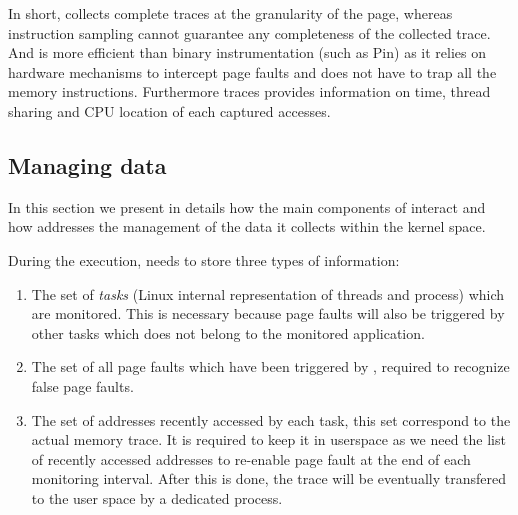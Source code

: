 In short, \Moca collects complete traces at the granularity of the page, whereas instruction
sampling cannot guarantee any completeness of the collected trace. And \Moca is 
more efficient than binary instrumentation (such as Pin) as it relies on hardware mechanisms
to intercept page faults and does not have to trap all the memory instructions.
Furthermore \Moca traces provides information on time, thread sharing and CPU
location of each captured accesses.


\subsection{Managing data}
\label{sec:design-tech}

In this section we present in details how the main components of \Moca
interact and how \Moca addresses the management of the data it collects
within the kernel space.

During the execution, \Moca needs to store three types of information:
\begin{enumerate}
    \item The set of \emph{tasks} (Linux internal representation of threads and process) which are
monitored. This is necessary because page faults will also be triggered by other tasks which does not belong to
the monitored application.
    \item The set of all page faults which have been triggered by \Moca,
        required to recognize false page faults.
    \item The set of addresses recently accessed by each task, this set
        correspond to the actual memory trace. It is required to keep it in
        userspace as we need the list of recently accessed addresses to
        re-enable page fault at the end of each monitoring interval. After
        this is done, the trace will be eventually transfered to
        the user space by a dedicated process.
\end{enumerate}

